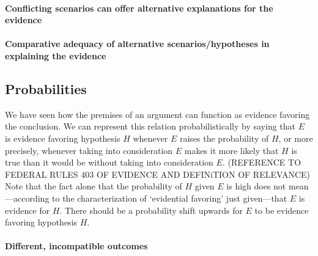 \documentclass[10pt]{article}
\begin{document}




\paragraph{Conflicting scenarios can offer alternative explanations for the evidence}

\paragraph{Comparative adequacy of alternative scenarios/hypotheses in explaining the evidence}





\subsection{Probabilities}

We have seen how the premises of an argument can function as evidence favoring the conclusion. We can represent this relation 
probabilistically by saying that $E$ is evidence favoring hypothesis $H$ whenever $E$ raises the probability of $H$, or more precisely, whenever taking into consideration $E$ makes it more likely that $H$ is true than it would be without taking into consideration $E$. (REFERENCE TO FEDERAL RULES 403 OF EVIDENCE AND DEFINiTION OF RELEVANCE)
Note that the fact alone that the probability of $H$ given $E$ is high does not mean---according to the characterization of `evidential favoring' just given---that 
$E$ is evidence for $H$. There should be a probability shift upwards for $E$ to be evidence favoring hypothesis $H$. 

\paragraph{Different, incompatible outcomes}
\end{document}
